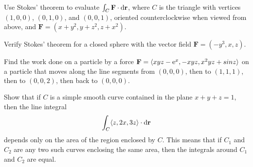 \documentclass{watsonbook}
\begin{document}

\begin{aexercise}
  Use Stokes' theorem to evaluate
  $\int_C\mathbf{F} \cdot \mathrm{d}\mathbf{r}$, where $C$ is the triangle
  with vertices $(1,0,0)$, $(0,1,0)$, and $(0,0,1)$, oriented
  counterclockwise when viewed from above, and
  $\mathbf{F} = (x+y^2,y+z^2,z+x^2)$.
\end{aexercise}

\begin{aexercise}
  Verify Stokes' theorem for a closed sphere with the vector field
  $\mathbf{F} = (-y^3,x,z)$. 
\end{aexercise}

\begin{aexercise}
  Find the work done on a particle by a force
  $\mathbf{F}=\langle xyz-\mathrm{e}^x, -xyz, x^2yz+sin z \rangle$ on a
  particle that moves along the line segments from $(0, 0, 0)$, then
  to $(1, 1, 1)$, then to $(0, 0, 2)$, then back to $(0, 0, 0)$.
\end{aexercise}

\begin{aexercise}
  Show that if $C$ is a simple smooth curve contained in the plane
  $x+y+z = 1$, then the line integral
  \[\int_C \langle z, 2x, 3z \rangle \cdot \mathrm{d}\mathbf{r}\]
  depends only on the area of the region enclosed by $C$. This means
  that if $C_1$ and $C_2$ are any two such curves enclosing the same
  area, then the integrals around $C_1$ and $C_2$ are equal.
\end{aexercise} 
\end{document}
